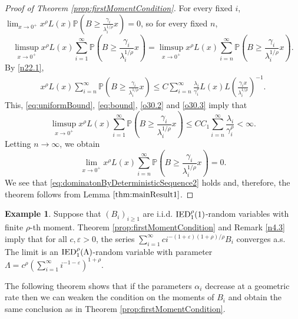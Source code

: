 \documentclass[bj]{imsart}
\numberwithin{equation}{section}
\renewcommand{\P}{\mathbb{P}}
\newcommand{\IGFT}{{\rm IED}}
\newcommand{\IED}{{\rm IED}}
\newcommand{\1}{\mathbf{1}}
\theoremstyle{definition}
\newtheorem{example}[thm]{Example}
\begin{document}
\begin{proof}[Proof of Theorem \ref{prop:firstMomentCondition}]
For every fixed $i$, $\lim_{x\to 0^+}x^\rho L(x)\P\left(B\geq \frac{\gamma_i}{\lambda_i^{1/\rho}}x\right)=0$, 
so for every fixed $n$,
\begin{equation}
 \limsup_{x\to 0^+}x^\rho L(x)\sum_{i=1}^\infty\P\left(B\geq \frac{\gamma_i}{\lambda_i^{1/\rho}}x\right)=\limsup_{x\to 0^+}x^\rho L(x)\sum_{i=n}^\infty\P\left(B\geq \frac{\gamma_i}{\lambda_i^{1/\rho}}x\right). \label{eq:bound} 
\end{equation}
By \eqref{n22.1}, 
\begin{align}\label{o30.2}
x^\rho L(x)\sum_{i=n}^\infty\P\left(B\geq \frac{\gamma_i}{\lambda_i^{1/\rho}}x\right) \leq C\sum_{i=n}^\infty 
\frac{\lambda_i}{\gamma_i^\rho}L(x)L\left(\frac{\gamma_ix}{\lambda_i^{1/\rho}}\right)^{-1}.
\end{align}
 This, \eqref{eq:uniformBound}, \eqref{eq:bound},  \eqref{o30.2} and \eqref{o30.3} imply that
 $$\limsup_{x\to 0^+}x^\rho L(x)\sum_{i=1}^\infty\P\left(B\geq \frac{\gamma_i}{\lambda_i^{1/\rho}}x\right)
 \leq  C C_1 \sum_{i=n}^\infty \frac{\lambda_i}{\gamma_i^\rho} < \infty.  $$
Letting $n\to \infty$, we obtain  
$$\lim_{x\to 0^+}x^\rho L(x)\sum_{i=n}^\infty\P\left(B\geq \frac{\gamma_i}{\lambda_i^{1/\rho}}x\right)=0.$$
We see that \eqref{eq:dominatonByDeterministicSequence2} holds and, therefore, the theorem follows from Lemma $\ref{thm:mainResult1}$.
\end{proof}\rm

\begin{example}
Suppose that $(B_i)_{i\geq 1}$ are i.i.d. $\IED^\rho_1(1)$-random variables with finite $\rho$-th moment.
Theorem \ref{prop:firstMomentCondition} and Remark \ref{n4.3} imply that
for all $c,\varepsilon >0$, the series $\sum_{i=1}^\infty  c i^{-(1+\varepsilon)(1+\rho)/\rho}B_i$ 
converges a.s. The limit is an $\IGFT^\rho_1(\Lambda)$-random variable with  parameter $\Lambda =c^{\rho}\left(\sum_{i=1}^{\infty} i^{-1-\varepsilon}\right)^{1+\rho}$.
\end{example}

The following theorem shows that  if the parameters $\alpha_i$ decrease at a geometric rate then we can weaken the condition on the moments of $B_i$
and obtain the same conclusion as in Theorem \ref{prop:firstMomentCondition}.
 
\end{document}
